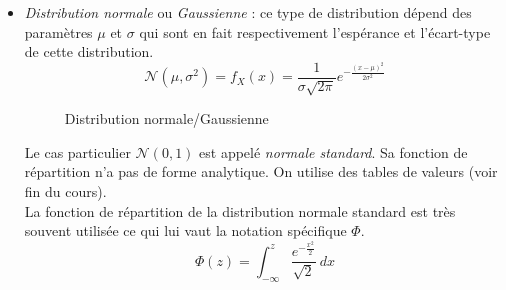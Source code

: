 \documentclass[a4paper,12pt]{report}
\theoremstyle{definition}
\newcommand{\x}{\times}
\renewcommand{\(}{\left(}
\renewcommand{\)}{\right)}
\renewcommand{\d}{\textit}
\begin{document}
\begin{itemize}[label = \textbullet]
                \item \d{Distribution normale} ou \d{Gaussienne} : ce type de distribution dépend des paramètres $\mu$ et $\sigma$ qui sont en fait respectivement l'espérance et l'écart-type de cette distribution.
                $$\mathcal{N}(\mu,\sigma^2) = f_X(x) = \frac{1}{\sigma\sqrt{2\pi}}e^{-\frac{(x-\mu)^2}{2\sigma^2}}$$
                \begin{figure}[H]
                \centering
                \caption{Distribution normale/Gaussienne}
                \end{figure}
                
                Le cas particulier $\mathcal{N}(0,1)$ est appelé \d{normale standard}. Sa fonction de répartition n'a pas de forme analytique. On utilise des tables de valeurs (voir fin du cours).\\
                
                La fonction de répartition de la distribution normale standard est très souvent utilisée ce qui lui vaut la notation spécifique $\Phi$. 
                $$\Phi(z)=\int_{-\infty}^z\frac{e^{-\frac{x^2}{2}}}{\sqrt{2}}~dx$$
            \end{itemize}
            
\end{document}
